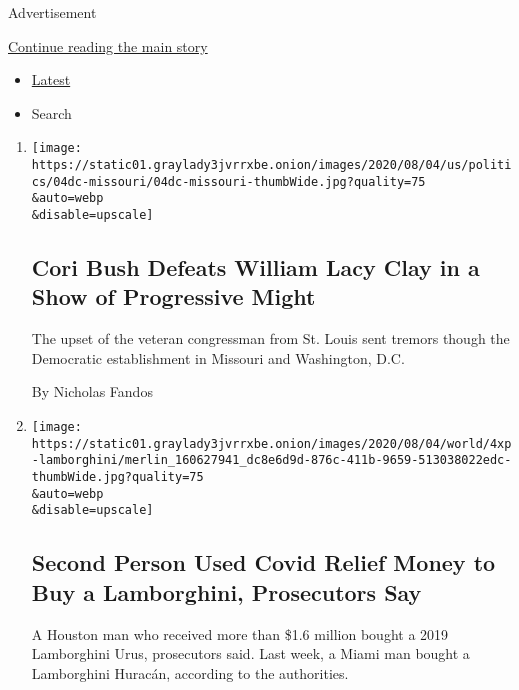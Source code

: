 Advertisement

\protect\hyperlink{after-mid1}{Continue reading the main story}

\begin{itemize}
\tightlist
\item
  \protect\hyperlink{stream-panel}{Latest}
\item
  Search
\end{itemize}

\begin{enumerate}
\def\labelenumi{\arabic{enumi}.}
\item
  \href{/2020/08/05/us/politics/cori-bush-missouri-william-lacy-clay.html}{}

  \texttt{[image: https://static01.graylady3jvrrxbe.onion/images/2020/08/04/us/politics/04dc-missouri/04dc-missouri-thumbWide.jpg?quality=75\\\&auto=webp\\\&disable=upscale]}

  \hypertarget{cori-bush-defeats-william-lacy-clay-in-a-show-of-progressive-might}{%
  \subsection{Cori Bush Defeats William Lacy Clay in a Show of
  Progressive
  Might}\label{cori-bush-defeats-william-lacy-clay-in-a-show-of-progressive-might}}

  The upset of the veteran congressman from St. Louis sent tremors
  though the Democratic establishment in Missouri and Washington, D.C.

  By Nicholas Fandos
\item
  \href{/2020/08/04/us/lamborghini-coronavirus-stimulus.html}{}

  \texttt{[image: https://static01.graylady3jvrrxbe.onion/images/2020/08/04/world/4xp-lamborghini/merlin\_160627941\_dc8e6d9d-876c-411b-9659-513038022edc-thumbWide.jpg?quality=75\\\&auto=webp\\\&disable=upscale]}

  \hypertarget{second-person-used-covid-relief-money-to-buy-a-lamborghini-prosecutors-say}{%
  \subsection{Second Person Used Covid Relief Money to Buy a
  Lamborghini, Prosecutors
  Say}\label{second-person-used-covid-relief-money-to-buy-a-lamborghini-prosecutors-say}}

  A Houston man who received more than \$1.6 million bought a 2019
  Lamborghini Urus, prosecutors said. Last week, a Miami man bought a
  Lamborghini Huracán, according to the authorities.


\end{enumerate}
